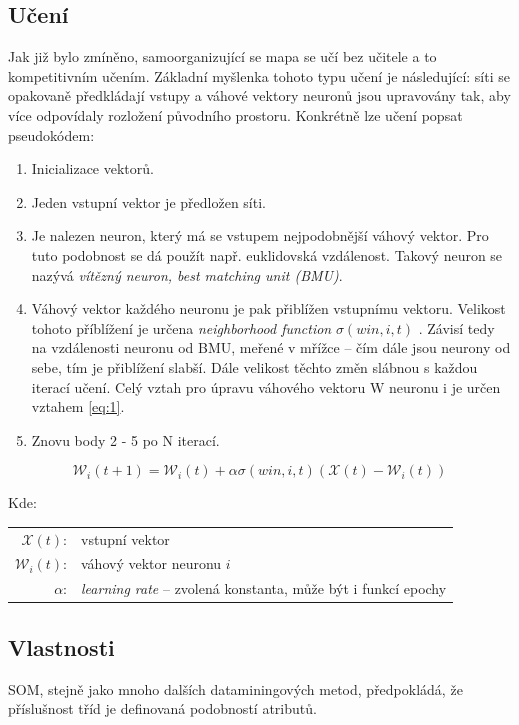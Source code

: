 \documentclass[thesis=M,czech]{FITthesis}[2012/06/26]
\begin{document}
\subsection{Učení}

Jak již bylo zmíněno, samoorganizující se mapa se učí bez učitele a to kompetitivním učením. Základní myšlenka tohoto typu učení je následující: síti se opakovaně předkládají vstupy a váhové vektory neuronů jsou upravovány tak, aby více odpovídaly rozložení původního prostoru.
Konkrétně lze učení popsat pseudokódem:

\begin{enumerate}
\item Inicializace vektorů.
\item Jeden vstupní vektor je předložen síti.
\item Je nalezen neuron, který má se vstupem nejpodobnější váhový vektor. Pro tuto podobnost se dá použít např. euklidovská vzdálenost. Takový neuron se nazývá \textit{vítězný neuron, best matching unit (BMU)}.
\item Váhový vektor každého neuronu je pak přiblížen vstupnímu vektoru. Velikost tohoto příblížení je určena \textit{neighborhood function} $\sigma(win, i, t)$ .
Závisí tedy na vzdálenosti neuronu od BMU, meřené v mřížce -- čím dále jsou neurony od sebe, tím je přiblížení slabší. Dále velikost těchto změn slábnou s každou iterací učení. Celý vztah pro úpravu váhového vektoru W neuronu i je určen vztahem \ref{eq:1}.


\item Znovu body 2 - 5 po N iterací.
\end{enumerate}

\begin{equation} \label{eq:1}
    \mathcal{W}_i(t+1) = \mathcal{W}_i(t) + \alpha \sigma(win, i, t)(\mathcal{X}(t) - \mathcal{W}_i(t))    
\end{equation}

Kde:\\
\hspace*{3em}
\begin{tabular}{rl}
    $\mathcal{X}(t)$:& vstupní vektor \\
    $\mathcal{W}_i(t)$:& váhový vektor neuronu $i$ \\
    $\alpha$:& \textit{learning rate} -- zvolená konstanta, může být i funkcí epochy \\
\end{tabular}


\subsection{Vlastnosti}
SOM, stejně jako mnoho dalších dataminingových metod, předpokládá, že příslušnost tříd je definovaná podobností atributů.
\end{document}
